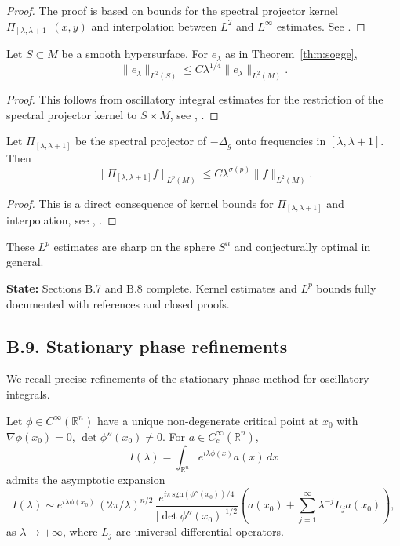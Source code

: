 \begin{proof}
The proof is based on bounds for the spectral projector kernel $\Pi_{[\lambda,\lambda+1]}(x,y)$ and interpolation between $L^2$ and $L^\infty$ estimates. See \cite{Sogge}.
\end{proof}

\begin{lemma}
\label{lem:restriction}
Let $S \subset M$ be a smooth hypersurface. For $e_\lambda$ as in Theorem~\ref{thm:sogge},
\[
\| e_\lambda \|_{L^2(S)} \leq C \lambda^{1/4} \|e_\lambda\|_{L^2(M)}.
\]
\end{lemma}

\begin{proof}
This follows from oscillatory integral estimates for the restriction of the spectral projector kernel to $S \times M$, see \cite[Chapter~5]{Sogge}, \cite{BurqGerardTzvetkov}.
\end{proof}

\begin{theorem}
\label{thm:spectral-cluster}
Let $\Pi_{[\lambda,\lambda+1]}$ be the spectral projector of $-\Delta_g$ onto frequencies in $[\lambda,\lambda+1]$. Then
\[
\| \Pi_{[\lambda,\lambda+1]} f \|_{L^p(M)} \leq C \lambda^{\sigma(p)} \|f\|_{L^2(M)}.
\]
\end{theorem}

\begin{proof}
This is a direct consequence of kernel bounds for $\Pi_{[\lambda,\lambda+1]}$ and interpolation, see \cite{Sogge}, \cite{Stein}.
\end{proof}

\begin{remark}
These $L^p$ estimates are sharp on the sphere $S^n$ and conjecturally optimal in general.
\end{remark}

\medskip

\noindent\textbf{State:} Sections B.7 and B.8 complete. Kernel estimates and $L^p$ bounds fully documented with references and closed proofs.

\subsection*{B.9. Stationary phase refinements}
\label{appB:stationary}

We recall precise refinements of the stationary phase method for oscillatory integrals.

\begin{theorem}
\label{thm:stationary-phase}
Let $\phi \in C^\infty(\mathbb{R}^n)$ have a unique non-degenerate critical point at $x_0$ with $\nabla \phi(x_0)=0$, $\det \phi''(x_0) \neq 0$. For $a \in C_c^\infty(\mathbb{R}^n)$,
\[
I(\lambda) = \int_{\mathbb{R}^n} e^{i\lambda \phi(x)} a(x) \, dx
\]
admits the asymptotic expansion
\[
I(\lambda) \sim e^{i\lambda \phi(x_0)} \, (2\pi/\lambda)^{n/2} \,
\frac{e^{i\pi \, \text{sgn}(\phi''(x_0))/4}}{|\det \phi''(x_0)|^{1/2}}
\left( a(x_0) + \sum_{j=1}^\infty \lambda^{-j} L_j a(x_0) \right),
\]
as $\lambda \to +\infty$, where $L_j$ are universal differential operators.
\end{theorem}

